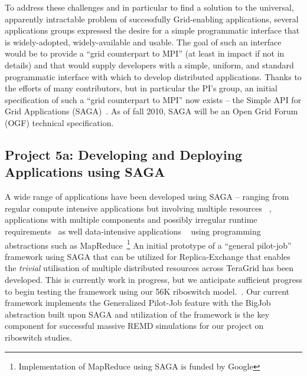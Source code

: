 \documentclass[a4paper,10pt]{article}
\newcommand{\up}{\vspace*{-1em}}
\begin{document}
To address these challenges and in particular to find a solution to the universal, apparently 
intractable problem of successfully Grid-enabling applications, several applications groups 
expressed the desire for a simple programmatic interface that is widely-adopted, widely-available 
and usable. The goal of such an interface would be to provide a ``grid counterpart to MPI'' (at 
least in impact if not in details) and that would supply developers with a simple, uniform, and 
standard programmatic interface with which to develop distributed applications.  Thanks to the 
efforts of many contributors, but in particular the PI's group, an initial specification of 
such a ``grid counterpart to MPI'' now exists -- the Simple API for Grid Applications 
(SAGA)~\cite{saga_url}. As of fall 2010, SAGA will be an Open Grid Forum (OGF) technical 
specification.

\up
\subsection*{Project 5a: Developing and Deploying Applications using SAGA}
\up

A wide range of applications have been developed using SAGA -- ranging from regular compute 
intensive applications but involving multiple resources ~\cite{saga_escience07, gmac, REMD-
PhilTranA2009}, applications with multiple components and possibly irregular runtime 
requirements~\cite{saga_loosely_coupled, teragrid08} as well data-intensive applications 
~\cite{saga_data_intensive, saga_grid_cloud} using programming abstractions such as 
MapReduce~\footnote{Implementation of MapReduce using SAGA is funded by Google} An initial 
prototype of a ``general pilot-job'' framework using SAGA that can be utilized for Replica-Exchange 
that enables the {\it trivial} utilisation of multiple distributed resources across TeraGrid has 
been developed. This is currently work in progress, but we anticipate sufficient progress to begin 
testing the framework using our 56K riboswitch model.~\cite{REMD-PhilTranA2009}. %
Our current framework implements the Generalized Pilot-Job feature with the BigJob abstraction 
built upon SAGA and utilization of the framework is the key component for successful massive REMD 
simulations for our project on riboswitch studies.
\end{document}
